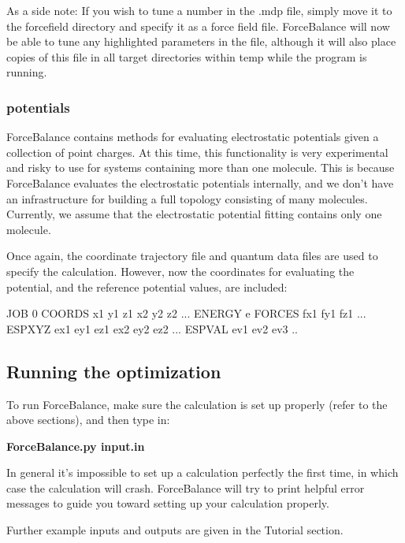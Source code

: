 As a side note\-: If you wish to tune a number in the .mdp file, simply move it to the {\ttfamily forcefield} directory and specify it as a force field file. Force\-Balance will now be able to tune any highlighted parameters in the file, although it will also place copies of this file in all target directories within {\ttfamily temp} while the program is running.\hypertarget{usage_Electrostatic}{}\subsubsection{potentials}\label{usage_Electrostatic}
Force\-Balance contains methods for evaluating electrostatic potentials given a collection of point charges. At this time, this functionality is very experimental and risky to use for systems containing more than one molecule. This is because Force\-Balance evaluates the electrostatic potentials internally, and we don't have an infrastructure for building a full topology consisting of many molecules. Currently, we assume that the electrostatic potential fitting contains only one molecule.

Once again, the coordinate trajectory file and quantum data files are used to specify the calculation. However, now the coordinates for evaluating the potential, and the reference potential values, are included\-:

\begin{DoxyVerb}JOB 0
COORDS x1 y1 z1 x2 y2 z2 ...
ENERGY e
FORCES fx1 fy1 fz1 ...
ESPXYZ ex1 ey1 ez1 ex2 ey2 ez2 ... 
ESPVAL ev1 ev2 ev3 ..
\end{DoxyVerb}
\hypertarget{usage_running_software}{}\subsection{Running the optimization}\label{usage_running_software}
To run Force\-Balance, make sure the calculation is set up properly (refer to the above sections), and then type in\-:

{\bfseries  Force\-Balance.\-py input.\-in }

In general it's impossible to set up a calculation perfectly the first time, in which case the calculation will crash. Force\-Balance will try to print helpful error messages to guide you toward setting up your calculation properly.

Further example inputs and outputs are given in the Tutorial section. 